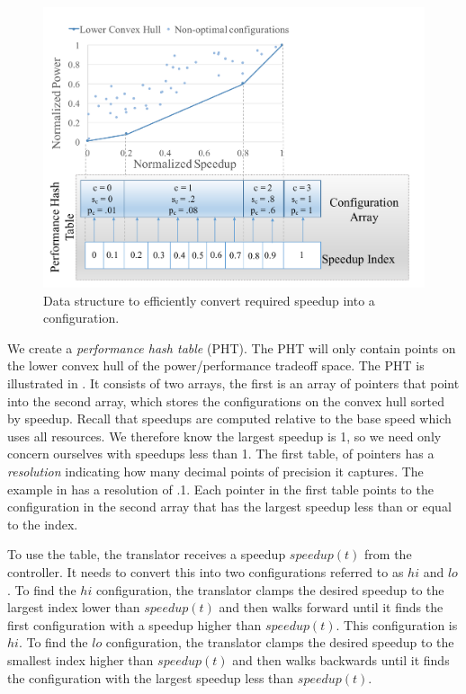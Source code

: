 \begin{figure}
\includegraphics[width=\columnwidth]{figures/performance-hash-table.pdf}
\caption{Data structure to efficiently convert required speedup into a
  configuration.}
  \label{fig:pht}
\end{figure}



We create a \emph{performance hash table} (PHT).  The PHT will only
contain points on the lower convex hull of the power/performance
tradeoff space.  The PHT is illustrated in .  It consists
of two arrays, the first is an array of pointers that point into the
second array, which stores the configurations on the convex hull
sorted by speedup.  Recall that speedups are computed relative to the
base speed which uses all resources.  We therefore know the largest
speedup is 1, so we need only concern ourselves with speedups less
than 1.  The first table, of pointers has a \emph{resolution}
indicating how many decimal points of precision it captures.  The
example in  has a resolution of .1.  Each pointer in the
first table points to the configuration in the second array that has
the largest speedup less than or equal to the index.

To use the table, the translator receives a speedup $speedup(t)$ from the
controller.  It needs to convert this into two configurations referred
to as $hi$ and $lo$.  To find the $hi$ configuration, the translator
clamps the desired speedup to the largest index lower than $speedup(t)$ and
then walks forward until it finds the first configuration with a
speedup higher than $speedup(t)$.  This configuration is $hi$.  To find the
$lo$ configuration, the translator clamps the desired speedup to the
smallest index higher than $speedup(t)$ and then walks backwards until it
finds the configuration with the largest speedup less than $speedup(t)$.

